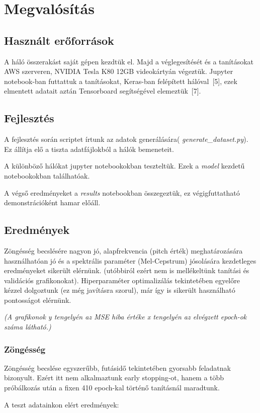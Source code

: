 \section{Megvalósítás}
\subsection{Használt erőforrások}
A háló összerakást saját gépen kezdtük el. Majd a véglegesítését és a tanításokat AWS szerveren, NVIDIA Tesla K80 12GB videokártyán végeztük. Jupyter notebook-ban futtattuk a tanításokat, Keras-ban felépített hálóval\ [5], ezek elmentett adatait aztán Tensorboard segítségével elemeztük\ [7].
\subsection{Fejlesztés}
A fejlesztés során scriptet írtunk az adatok generálására( {\it generate\_dataset.py}). Ez állítja elő a tiszta adatfájlokból a hálók bemeneteit.

A különböző hálókat jupyter notebookokban teszteltük. Ezek a {\it model} kezdetű notebookokban találhatóak.

A végső eredményeket a {\it results} notebookban összegeztük, ez végigfuttatható demonstrációként hamar előáll. 
\subsection{Eredmények}
Zöngésség becslésére nagyon jó, alapfrekvencia (pitch érték) meghatározására használhatóan jó és a spektrális paraméter (Mel-Cepstrum) jósolására kezdetleges eredményeket sikerült elérnünk. (utóbbiról ezért nem is mellékeltünk tanítási és validációs grafikonokat). Hiperparaméter optimalizálás tekintetében egyelőre kézzel dolgoztunk (ez még javításra szorul), már így is sikerült használható pontosságot  elérnünk.

\textit{(A grafikonok y tengelyén az MSE hiba értéke x tengelyén az elvégzett epoch-ok száma látható.)}

\subsubsection{Zöngésség}
	Zöngésség becslése egyszerűbb, futásidő tekintetében gyorsabb feladatnak bizonyult. Ezért itt nem alkalmaztunk early stopping-ot, hanem a több próbálkozás után a fixen 410 epoch-kal történő tanításnál maradtunk.
	
	A teszt adatainkon elért eredmények:
	
